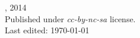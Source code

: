 \documentclass[grammar]{subfiles}
\begin{document}
\null\vfill
\begin{minipage}[b][][b]{0.5\textwidth}

  {\normalsize\ccbyncsa}\small\qquad\theauthor, 2014\\[\parsep]
  Published under \textit{cc-by-nc-sa} license.  \\
  Last edited: \today\\[2\parsep]

\end{minipage}
\end{document}
